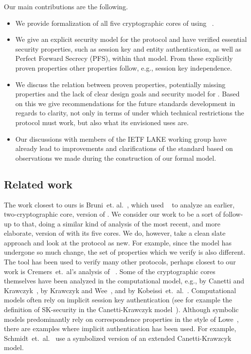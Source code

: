 \documentclass[runningheads,draft,x11names]{llncs}
\begin{document}
Our main contributions are the following.
\begin{itemize}
    \item We provide formalization of all five cryptographic cores of \mEdhoc{}
        using \mTamarin~\cite{DBLP:conf/cav/MeierSCB13}.
    \item We give an explicit security model for the protocol and have verified
        essential security properties, such as session key and entity
        authentication, as well as Perfect Forward Secrecy (PFS), within that
        model.
        From these explicitly proven properties other properties follow, e.g.,
        session key independence.
    \item We discuss the relation between proven properties, potentially missing
        properties and the lack of clear design goals and security model for
        \mEdhoc{}.
        Based on this we give recommendations for the future standards
        development in regards to clarity, not only in terms of under which
        technical restrictions the protocol must work, but also what its
        envisioned uses are.
    \item Our discussions with members of the IETF LAKE working group have already
        lead to improvements and clarifications of the standard \mSpec{} based
        on observations we made during the construction of our formal model.
\end{itemize}

\subsection{Related work}
\label{sec:relatedWork}
The work closest to ours is Bruni~et. al.~\cite{DBLP:conf/secsr/BruniJPS18},
which used \mProverif~\cite{DBLP:conf/csfw/Blanchet01} to analyze an earlier,
two-cryptographic core, version of \mEdhoc.
%
We consider our work to be a sort of follow-up to that, doing a similar kind of
analysis of the most recent, and more elaborate, version of \mEdhoc{} with its
five cores.
%
We do, however, take a clean slate approach and look at the protocol as new.
%
For example, since the model has undergone so much change, the set of properties
which we verify is also different.
%
The \mTamarin{} tool has been used to verify many other protocols, perhaps
closest to our work is Cremers~et.~al's analysis of
\mTls~\cite{DBLP:conf/ccs/CremersHHSM17}.
%
Some of the cryptographic cores themselves have been analyzed in the
computational model, e.g., \mSigma{} by Canetti and
Krawczyk~\cite{DBLP:conf/crypto/CanettiK02}, \mOptls{} by Krawczyk and
Wee~\cite{DBLP:conf/eurosp/KrawczykW16}, and \mNoise{} by
Kobeissi~et.~al.~\cite{DBLP:conf/eurosp/KobeissiNB19}.
%
Computational models often rely on implicit session key authentication
(see for example the definition of SK-security in the Canetti-Krawczyk
model~\cite{DBLP:conf/crypto/CanettiK02}).
%
Although symbolic models predominantly rely on correspondence properties in the
style of Lowe~\cite{DBLP:conf/csfw/Lowe97a}, there are examples where implicit
authentication has been used.
%
For example, Schmidt~et.~al.~\cite{DBLP:conf/csfw/SchmidtMCB12} use a
symbolized version of an extended Canetti-Krawzcyk model.
%
\end{document}
